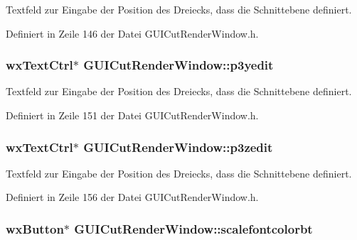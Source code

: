Textfeld zur Eingabe der Position des Dreiecks, dass die Schnittebene definiert. 



Definiert in Zeile 146 der Datei G\-U\-I\-Cut\-Render\-Window.\-h.

\hypertarget{classGUICutRenderWindow_a5f908b41a4d9db847cd89c0a3c52b61a}{
\subsubsection[{p3yedit}]{\setlength{\rightskip}{0pt plus 5cm}wx\-Text\-Ctrl$\ast$ G\-U\-I\-Cut\-Render\-Window\-::p3yedit\hspace{0.3cm}{\ttfamily [private]}}}\label{classGUICutRenderWindow_a5f908b41a4d9db847cd89c0a3c52b61a}


Textfeld zur Eingabe der Position des Dreiecks, dass die Schnittebene definiert. 



Definiert in Zeile 151 der Datei G\-U\-I\-Cut\-Render\-Window.\-h.

\hypertarget{classGUICutRenderWindow_ac4c2f8825a9596f32093f0ac08a7848d}{
\subsubsection[{p3zedit}]{\setlength{\rightskip}{0pt plus 5cm}wx\-Text\-Ctrl$\ast$ G\-U\-I\-Cut\-Render\-Window\-::p3zedit\hspace{0.3cm}{\ttfamily [private]}}}\label{classGUICutRenderWindow_ac4c2f8825a9596f32093f0ac08a7848d}


Textfeld zur Eingabe der Position des Dreiecks, dass die Schnittebene definiert. 



Definiert in Zeile 156 der Datei G\-U\-I\-Cut\-Render\-Window.\-h.

\hypertarget{classGUICutRenderWindow_a13a1557216de339d20189fdaa0df482b}{
\subsubsection[{scalefontcolorbt}]{\setlength{\rightskip}{0pt plus 5cm}wx\-Button$\ast$ G\-U\-I\-Cut\-Render\-Window\-::scalefontcolorbt\hspace{0.3cm}{\ttfamily [private]}}}\label{classGUICutRenderWindow_a13a1557216de339d20189fdaa0df482b}



